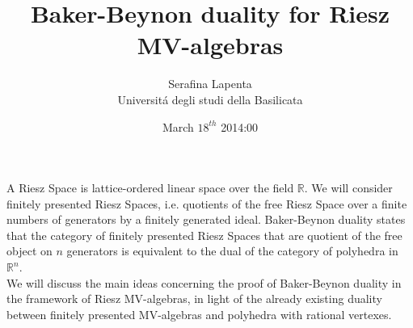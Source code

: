 \documentclass[10pt,a4paper]{article}
\title{Baker-Beynon duality for Riesz MV-algebras}
\author{Serafina Lapenta\\ Universit\' a degli studi della Basilicata}
\date{March $18^{th}$ 2014\quad 15:00}
\begin{document}
\maketitle
A Riesz Space is lattice-ordered linear space over the field $\mathbb{R}$. We will consider finitely presented Riesz Spaces, i.e. quotients of the free Riesz Space over a finite numbers of generators by a finitely generated ideal. Baker-Beynon duality states that the category of finitely presented Riesz Spaces that are quotient of the free object on $n$ generators is equivalent to the dual of the category of polyhedra in $\mathbb{R}^n$.\\
We will discuss the main ideas concerning the proof of Baker-Beynon duality in the framework of Riesz MV-algebras, in light of the already existing duality between finitely presented MV-algebras and polyhedra with rational vertexes.
\end{document}
